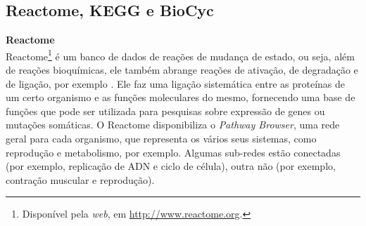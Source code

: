 

\subsection{Reactome, KEGG e BioCyc}

\textbf{Reactome} \\

\indent Reactome\footnote{Disponível pela \textit{web}, em \url{http://www.reactome.org}.} é um banco de dados de reações de mudança de estado, ou seja, além de reações bioquímicas, ele também abrange reações de ativação, de degradação e de ligação, por exemplo \cite{reactomeUsersguide}. Ele faz uma ligação sistemática entre as proteínas de um certo organismo e as funções moleculares do mesmo, fornecendo uma base de funções que pode ser utilizada para pesquisas sobre expressão de genes ou mutações somáticas. 
\indent O Reactome disponibiliza o \textit{Pathway Browser}, uma rede geral para cada organismo, que representa os vários seus sistemas, como reprodução e metabolismo, por exemplo. Algumas sub-redes estão conectadas (por exemplo, replicação de ADN e ciclo de célula), outra não (por exemplo, contração muscular e reprodução). 

